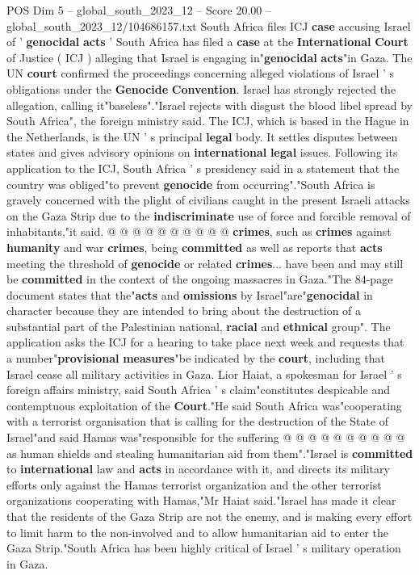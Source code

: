 \begin{textsample}{POS Dim 5 – global\_south\_2023\_12 – Score 20.00 – global\_south\_2023\_12/104686157.txt}  \label{ex:f5_pos_212}
South Africa files ICJ \textbf{case} accusing Israel of ' \textbf{genocidal} \textbf{acts} ' South Africa has filed a \textbf{case} at the \textbf{International} \textbf{Court} of Justice ( ICJ ) alleging that Israel is engaging in"\textbf{genocidal} \textbf{acts}"in Gaza.
The UN \textbf{court} confirmed the proceedings concerning alleged violations of Israel ' s obligations under the \textbf{Genocide} \textbf{Convention}.
Israel has strongly rejected the allegation, calling it"baseless"."Israel rejects with disgust the blood libel spread by South Africa", the foreign ministry said.
The ICJ, which is based in the Hague in the Netherlands, is the UN ' s principal \textbf{legal} body.
It settles disputes between states and gives advisory opinions on \textbf{international} \textbf{legal} issues.
Following its application to the ICJ, South Africa ' s presidency said in a statement that the country was obliged"to prevent \textbf{genocide} from occurring"."South Africa is gravely concerned with the plight of civilians caught in the present Israeli attacks on the Gaza Strip due to the \textbf{indiscriminate} use of force and forcible removal of inhabitants,"it said. @ @ @ @ @ @ @ @ @ @ \textbf{crimes}, such as \textbf{crimes} against \textbf{humanity} and war \textbf{crimes}, being \textbf{committed} as well as reports that \textbf{acts} meeting the threshold of \textbf{genocide} or related \textbf{crimes}... have been and may still be \textbf{committed} in the context of the ongoing massacres in Gaza."The 84-page document states that the"\textbf{acts} and \textbf{omissions} by Israel"are"\textbf{genocidal} in character because they are intended to bring about the destruction of a substantial part of the Palestinian national, \textbf{racial} and \textbf{ethnical} group".
The application asks the ICJ for a hearing to take place next week and requests that a number"\textbf{provisional} \textbf{measures}"be indicated by the \textbf{court}, including that Israel cease all military activities in Gaza.
Lior Haiat, a spokesman for Israel ' s foreign affairs ministry, said South Africa ' s claim"constitutes despicable and contemptuous exploitation of the \textbf{Court}."He said South Africa was"cooperating with a terrorist organisation that is calling for the destruction of the State of Israel"and said Hamas was"responsible for the suffering @ @ @ @ @ @ @ @ @ @ as human shields and stealing humanitarian aid from them"."Israel is \textbf{committed} to \textbf{international} law and \textbf{acts} in accordance with it, and directs its military efforts only against the Hamas terrorist organization and the other terrorist organizations cooperating with Hamas,"Mr Haiat said."Israel has made it clear that the residents of the Gaza Strip are not the enemy, and is making every effort to limit harm to the non-involved and to allow humanitarian aid to enter the Gaza Strip."South Africa has been highly critical of Israel ' s military operation in Gaza.

\end{textsample}
